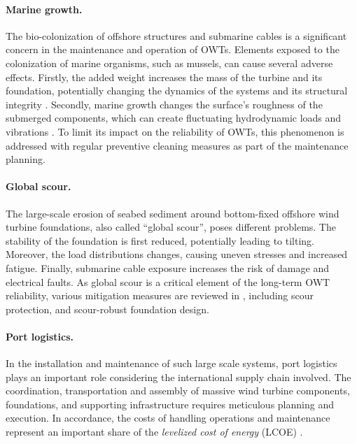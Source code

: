 

\paragraph{Marine growth.}
The bio-colonization of offshore structures and submarine cables is a significant concern in the maintenance and operation of OWTs. 
Elements exposed to the colonization of marine organisms, such as mussels, can cause several adverse effects. 
Firstly, the added weight increases the mass of the turbine and its foundation, potentially changing the dynamics of the systems and its structural integrity \citep{ameryoun_2019_marine_growth,schoefs_2022_reliability_marine_growth}. 
Secondly, marine growth changes the surface's roughness of the submerged components, which can create fluctuating hydrodynamic loads and vibrations \citep{marty_2021_cable_marine_growth}. 
To limit its impact on the reliability of OWTs, this phenomenon is addressed with regular preventive cleaning measures as part of the maintenance planning. 


\paragraph{Global scour.}
The large-scale erosion of seabed sediment around bottom-fixed offshore wind turbine foundations, also called ``global scour'', poses different problems. 
The stability of the foundation is first reduced, potentially leading to tilting. 
Moreover, the load distributions changes, causing uneven stresses and increased fatigue. 
Finally, submarine cable exposure increases the risk of damage and electrical faults. 
As global scour is a critical element of the long-term OWT reliability, various mitigation measures are reviewed in \citet{fazeres_2021_scour}, including scour protection, and scour-robust foundation design.


\paragraph{Port logistics.}
In the installation and maintenance of such large scale systems, port logistics plays an important role considering the international supply chain involved. 
The coordination, transportation and assembly of massive wind turbine components, foundations, and supporting infrastructure requires meticulous planning and execution. 
In accordance, the costs of handling operations and maintenance represent an important share of the \textit{levelized cost of energy} (LCOE) \citep{shields_2021_owt_lcoe}.  

